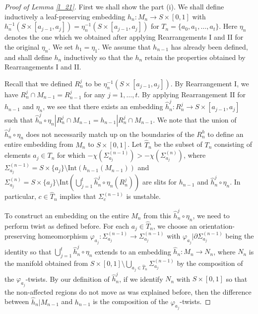 \documentclass{amsart}
\theoremstyle{definition}
\numberwithin{figure}{section}
\numberwithin{equation}{section}
\def\part{\partial}
\def\Int{\mathrm{Int}}
\def\Sg{\Sigma}
\def\Sg{\Sigma}
\begin{document}
\begin{proof}[Proof of Lemma \ref{l_21}]
First we shall show the part (i).
We shall define inductively a leaf-preserving embedding $h_n: M_n \rightarrow S \times [0,1]$ with $h_n^{-1}(S \times [a_{j-1}, a_j])=\eta_n^{-1}(S \times [a_{j-1}, a_j])$ for $T_n=\{a_0,a_1,\dots, a_t\}$.
Here $\eta_n$ denotes the one which we obtained after applying Rearrangements I and II for the original $\eta_n$.
We set $h_1=\eta_1$.
We assume that $h_{n-1}$ has already been defined, and shall define $h_n$ inductively so that the $h_n$ retain the properties obtained by Rearrangements I and II.

Recall that we defined $R_n^j$ to be $\eta_n^{-1}(S \times [a_{j-1}, a_j])$.
By Rearrangement I, we have $R_n^j \cap M_{n-1}=R_{n-1}^j$ for any $j=1,\dots,t$.
By applying Rearrangement II for $h_{n-1}$ and $\eta_n$, we see that there exists an embedding $\hat h_n^j:R_n^j\rightarrow S\times [a_{j-1},a_j]$ such that $\hat h_n^j \circ \eta_n|R_n^j\cap M_{n-1} 
= h_{n-1}|R_n^j\cap M_{n-1}$.
We note that the union of $\hat h_n^j \circ \eta_n$ does not necessarily match up on the boundaries of the $R_n^h$ to define an entire embedding from $M_n$ to $S\times [0,1]$.
Let $\hat T_n$ be the subset of $T_n$ consisting of elements $a_j\in T_n$ for which $-\chi(\Sg_{a_j}^{(n-1)})>-\chi(\Sg_{a_j}^{(n)})$, 
where $\Sg_{a_j}^{(n-1)}=S\times \{a_j\}\setminus \Int(h_{n-1}(M_{n-1}))$ and $\Sg_{a_j}^{(n)}=S\times \{a_j\}\setminus  \Int(\bigcup_{j=1}^t \hat h^j_n \circ \eta_n(R_n^j))$ are slits for $h_{n-1}$ and $\hat h^j_n \circ \eta_n$.
In particular, $c\in \hat T_n$ implies that $\Sg_c^{(n-1)}$ is unstable.

To construct an embedding on the entire $M_n$ from this $\hat h_n^j \circ \eta_n$, we need to perform twist as defined before.
For each $a_j \in \hat T_n$, we  choose an orientation-preserving homeomorphism $\varphi_{a_j}:\Sg_{a_j}^{(n-1)}\rightarrow \Sg_{a_j}^{(n-1)}$  with $\varphi_{a_j}|\part \Sg_{a_j}^{(n-1)}$ being the identity  so that $\bigcup_{j=1}^t \hat h^j_n \circ \eta_n$ extends to an embedding $\hat h_n:M_n\rightarrow N_n$, where $N_n$ is the manifold obtained from $S\times [0,1]\setminus \bigcup_{a_j\in \hat T_n}\Sg_{a_j}^{(n-1)}$ by the composition of the $\varphi_{a_j}$-twists.
By our definition of $\hat h^j_n$, if we identify $N_n$ with $S\times [0,1]$ so that the non-affected regions do not move as was explained before, then the difference between $\hat h_n|M_{n-1}$ and $h_{n-1}$ is the composition of the $\varphi_{a_j}$-twists.


\end{proof}
\end{document}
